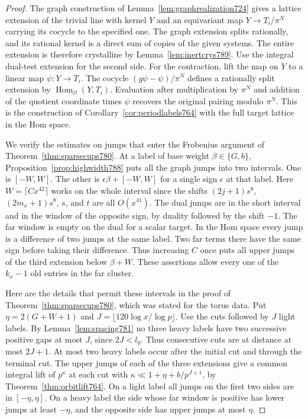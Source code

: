 \documentclass[a4paper,11pt]{article}
\theoremstyle{definition}
\theoremstyle{remark}
\numberwithin{equation}{section}
\begin{document}
\begin{proof}
The graph construction of
Lemma~\ref{lem:graphrealization724} gives a lattice
extension of the trivial line with kernel \(Y\)
and an equivariant map \(Y\to T_i/\pi^N\) carrying
its cocycle to the specified one. The graph extension
splits rationally, and its rational kernel is a direct
sum of copies of the given systems. The entire extension
is therefore crystalline by Lemma~\ref{lem:inertcrys789}.
Use the integral
dual-test extension for the second side. For the
contraction, lift the map on \(Y\) to a linear map
\(\psi:Y\to T_i\). The cocycle
\((g\psi-\psi)/\pi^N\) defines a rationally split
extension by \(\operatorname{Hom}_{\mathcal O}(Y,T_i)\).
Evaluation after multiplication by \(\pi^N\) and
addition of the quotient coordinate times \(\psi\)
recovers the original pairing modulo \(\pi^N\).
This is the construction of
Corollary~\ref{cor:periodlabels764} with the full
target lattice in the Hom space.

We verify the estimates on jumps that enter the
Frobenius argument of Theorem~\ref{thm:sparsecups780}.
At a label of base weight \(\beta\in\{G,b\}\),
Proposition~\ref{prop:highwidth788} puts all the
graph jumps into two intervals. One is \([-W,W]\).
The other is \(\epsilon\beta+[-W,W]\) for a single
sign \(\epsilon\) at that label. Here
\(W=\lceil C x^{42}\rceil\) works on the whole
interval since the shifts \((2j+1)s^8\), \((2m_x+1)s^8\),
\(s\), and \(t\) are all \(O(x^{41})\).
The dual jumps are in the short interval and in the
window of the opposite sign, by duality followed by
the shift \(-1\). The far window is empty on the
dual for a scalar target. In the Hom space every
jump is a difference of two jumps at the same label.
Two far terms there have the same sign before taking
their difference. Thus increasing \(C\) once puts
all upper jumps of the third extension below
\(\beta+W\). These assertions allow every one of the
\(k_x-1\) old entries in the far cluster.

Here are the details that permit these intervals in
the proof of Theorem~\ref{thm:sparsecups780}, which
was stated for the torus data. Put
\(\eta=2(G+W+1)\) and
\(J=\lfloor120\log x/\log p\rfloor\).
Use the cuts followed by \(J\) light labels. By
Lemma~\ref{lem:spacing781} no three heavy labels
have two successive positive gaps at most \(J\),
since \(2J<l_0\). Thus consecutive cuts are at distance
at most \(2J+1\). At most two heavy labels occur after
the initial cut and through the terminal cut. The upper jumps
of each of the three extensions give a common
integral lift of \(p^\kappa\) at each cut with
\(\kappa\ll1+\eta+b/p^{J+1}\), by
Theorem~\ref{thm:orbitlift764}. On a light label all
jumps on the first two sides are in \([-\eta,\eta]\).
On a heavy label the side whose far window is positive
has lower jumps at least \(-\eta\), and the opposite
side has upper jumps at most \(\eta\).


\end{proof}
\end{document}
